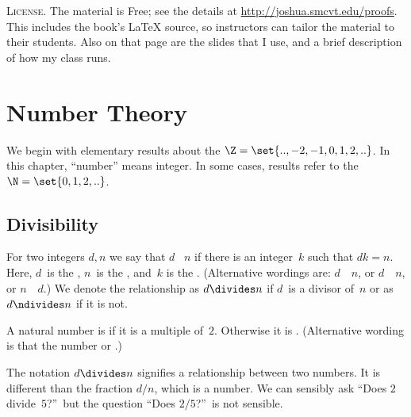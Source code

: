 \documentclass{ibl}
\begin{document}
\medskip
\textsc{License.}
The material is Free; see the details  
at \url{http://joshua.smcvt.edu/proofs}.
This includes the book's \LaTeX{} source, so instructors can tailor the
material to their students.  
Also on that page are the slides that I use,
and a brief description of how my class runs.




\mainmatter
\pagestyle{bodypage}
\chapter{Number Theory}

We begin with elementary results about the
 $\Z=\set{..,-2,-1,0,1,2,..}$.
In this chapter, ``number'' means integer.
In some cases, results refer to the 
 $\N=\set{0,1,2,..}$.



\section{Divisibility}

\begin{df}
  For two integers $d,n$ we say that
  $d$ ~$n$
  if there is an integer~$k$ such that $dk=n$.
  Here, $d$~is the , 
  $n$~is the ,
  and~$k$ is the .
  (Alternative wordings are:
  $d$~~$n$,
  or $d$~~$n$,
  or $n$~~$d$.)
  We denote the relationship as
  $d\divides n$ if $d$~is a divisor of~$n$
  or as $d\ndivides n$ if it is not.
\end{df}

\begin{df}
  A natural number is  if it is a multiple of~$2$.
  Otherwise it is .
  (Alternative wording is that the number 
  or .)
\end{df}

  The notation $d\divides n$ signifies a relationship between two numbers.
  It is different than the fraction $d/n$, which is a number.
  We can sensibly ask ``Does $2$ divide~$5$?''\
  but the question ``Does $2/5$?''\ is not sensible.   
\end{document}
